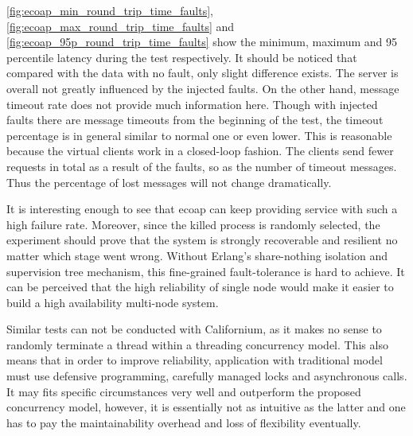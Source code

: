 \autoref{fig:ecoap_min_round_trip_time_faults}, \autoref{fig:ecoap_max_round_trip_time_faults} and \autoref{fig:ecoap_95p_round_trip_time_faults} show the minimum, maximum and 95 percentile latency during the test respectively. It should be noticed that compared with the data with no fault, only slight difference exists. The server is overall not greatly influenced by the injected faults. On the other hand, message timeout rate does not provide much information here. Though with injected faults there are message timeouts from the beginning of the test, the timeout percentage is in general similar to normal one or even lower. This is reasonable because the virtual clients work in a closed-loop fashion. The clients send fewer requests in total as a result of the faults, so as the number of timeout messages. Thus the percentage of lost messages will not change dramatically.

It is interesting enough to see that ecoap can keep providing service with such a high failure rate. Moreover, since the killed process is randomly selected, the experiment should prove that the system is strongly recoverable and resilient no matter which stage went wrong. Without Erlang's share-nothing isolation and supervision tree mechanism, this fine-grained fault-tolerance is hard to achieve. It can be perceived that the high reliability of single node would make it easier to build a high availability multi-node system.

Similar tests can not be conducted with Californium, as it makes no sense to randomly terminate a thread within a threading concurrency model. This also means that in order to improve reliability, application with traditional model must use defensive programming, carefully managed locks and asynchronous calls. It may fits specific circumstances very well and outperform the proposed concurrency model, however, it is essentially not as intuitive as the latter and one has to pay the maintainability overhead and loss of flexibility eventually.

